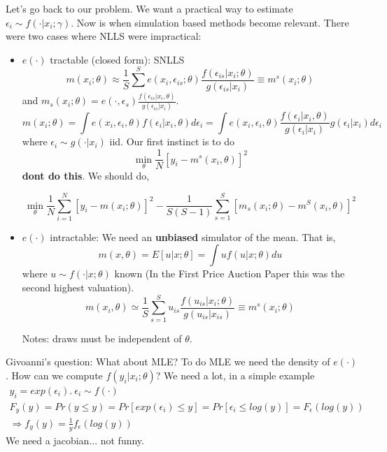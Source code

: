 \documentclass[12pt]{article}
\begin{document}
	Let's go back to our problem. We want a practical way to estimate $\epsilon_i \sim f(\cdot | x_i; \gamma )$. Now is when simulation based methods become relevant. There were two cases where NLLS were impractical:
	\begin{itemize}
		\item $e(\cdot)$ tractable (closed form): SNLLS
		\begin{equation}
		m(x_i; \theta) \approx \frac{1}{S} \sum^S e(x_i, \epsilon_{is};\theta) \frac{f(\epsilon_{is} | x_i ; \theta)}{ g(\epsilon_{is} | x_i)} \equiv m^s(x_i;\theta)
		\end{equation}
		 and $m_s(x_i;\theta) = e(\cdot, \epsilon_s ) \frac{f(\epsilon_{is} | x_i , \theta)}{ g(\epsilon_{is} | x_i)}$.
		\begin{equation}
			m(x_i;\theta) = \int e(x_i, \epsilon_i, \theta)f(\epsilon_i | x_i, \theta) d \epsilon_i = \int e(x_i, \epsilon_i, \theta) \frac{f(\epsilon_i | x_i, \theta)}{g(\epsilon_i | x_i)} g(\epsilon_i | x_i) d \epsilon_i
		\end{equation}
		where $\epsilon_i \sim g(\cdot | x_i)$ iid. Our first instinct is to do
		\begin{equation}
			\min_{\theta} \frac{1}{N} [y_i - m^s(x_i, \theta)]^2
		\end{equation}
		\textbf{dont do this}. We should do,

		\begin{equation}
			\min_{\theta} \frac{1}{N} \sum_{i=1}^N { [y_i - m(x_i; \theta)]^2 - \frac{1}{S(S-1)} \sum^S_{s = 1} [m_s(x_i;\theta) - m^S(x_i,\theta)]^2 }
		\end{equation}

	\item $e(\cdot)$ intractable: We need an \textbf{unbiased} simulator of the mean. That is,
	\begin{equation}
	 m(x,\theta) = E[u | x; \theta] = \int u f(u|x;\theta) du
	 \end{equation}
	  where $u \sim f(\cdot|x;\theta)$ known (In the First Price Auction Paper this was the second highest valuation).
		\begin{equation}
			m(x_i, \theta) \simeq \frac{1}{S} \sum^S_{s = 1} u_{is} \frac{f(u_{is} |x_i; \theta) }{g(u_{is} | x_{is} )} \equiv m^s(x_i;\theta)
		\end{equation}

		Notes: draws must be independent of $\theta$.
	\end{itemize}

	Givoanni's question: What about MLE? To do MLE we need the density of $e(\cdot)$. How can we compute $f(y_i|x_i;\theta)$? We need a lot, in a simple example
	\begin{eqnarray*}
		y_i = exp(\epsilon_i). \ \epsilon_i \sim f(\cdot) \\
		F_y(y) = Pr(y \leq y) = Pr[exp(\epsilon_i) \leq y] = Pr[\epsilon_i \leq log(y)] = F_\epsilon (log(y)) \\
		\Rightarrow f_y (y) = \frac{1}{y} f_\epsilon(log(y))
	\end{eqnarray*}
	We need a jacobian... not funny.
\end{document}

